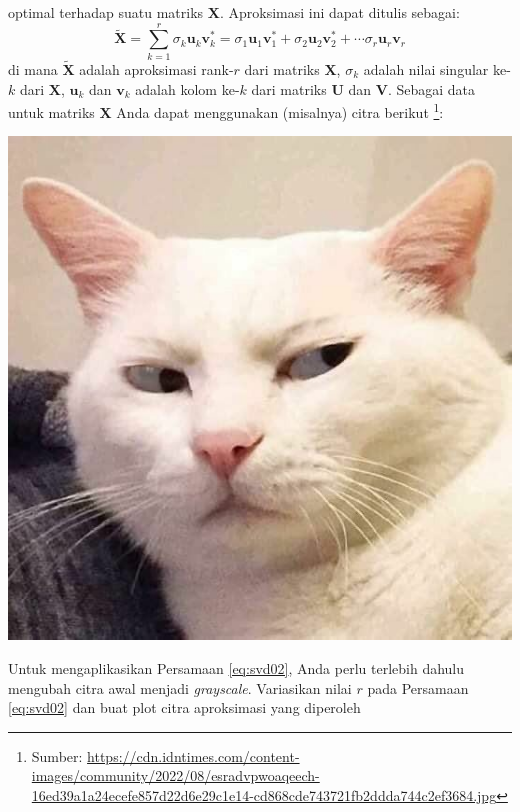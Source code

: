 \documentclass[a4paper,11pt]{article} %
\begin{document}
\begin{enumerate}
optimal terhadap suatu matriks $\mathbf{X}$. Aproksimasi ini
dapat ditulis sebagai:
\begin{equation}
\tilde{\mathbf{X}} = \sum_{k=1}^{r} \sigma_{k} \mathbf{u}_{k} \mathbf{v}^{*}_{k}
= \sigma_{1} \mathbf{u}_{1} \mathbf{v}^{*}_{1} +
\sigma_{2} \mathbf{u}_{2} \mathbf{v}^{*}_{2} + \cdots
\sigma_{r} \mathbf{u}_{r} \mathbf{v}_{r}
\label{eq:svd02}
\end{equation}
di mana $\tilde{\mathbf{X}}$ adalah aproksimasi rank-$r$ dari matriks
$\mathbf{X}$, $\sigma_{k}$ adalah nilai singular ke-$k$ dari $\mathbf{X}$,
$\mathbf{u}_{k}$ dan $\mathbf{v}_{k}$ adalah kolom
ke-$k$ dari matriks $\mathbf{U}$ dan $\mathbf{V}$.
%
Sebagai data untuk matriks $\mathbf{X}$ Anda dapat menggunakan (misalnya)
citra berikut \footnote{Sumber:
\url{https://cdn.idntimes.com/content-images/community/2022/08/esradvpwoaqeech-16ed39a1a24ecefe857d22d6e29c1e14-cd868cde743721fb2ddda744c2ef3684.jpg}}:

{\centering
\includegraphics[scale=0.5]{images/kucing01.png}
\par}

Untuk mengaplikasikan Persamaan \eqref{eq:svd02}, Anda perlu terlebih dahulu
mengubah citra awal menjadi \textit{grayscale}.
Variasikan nilai $r$ pada Persamaan \eqref{eq:svd02} dan buat plot citra aproksimasi
yang diperoleh
\end{enumerate}
\end{document}

